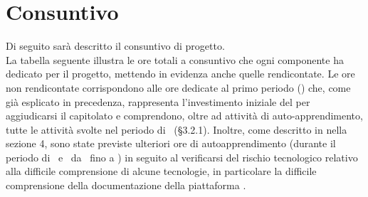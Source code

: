 \newpage

\section{Consuntivo}
Di seguito sarà descritto il consuntivo di progetto.\\
La tabella seguente illustra le ore totali a consuntivo che ogni componente ha dedicato per il progetto, mettendo in evidenza anche quelle rendicontate. Le ore non rendicontate corrispondono alle ore dedicate al primo periodo (\ARM) che, come già esplicato in precedenza, rappresenta l'investimento iniziale del  per aggiudicarsi il capitolato e comprendono, oltre ad attività di auto-apprendimento, tutte le attività svolte nel periodo di \ARM\ (§3.2.1). Inoltre, come descritto in nella sezione 4, sono state previste ulteriori ore di autoapprendimento (durante il periodo di \PD\ e \COD\ da \RP\ fino a \RQ) in seguito al verificarsi del rischio tecnologico relativo alla difficile comprensione di alcune tecnologie, in particolare la difficile comprensione della documentazione della piattaforma .

